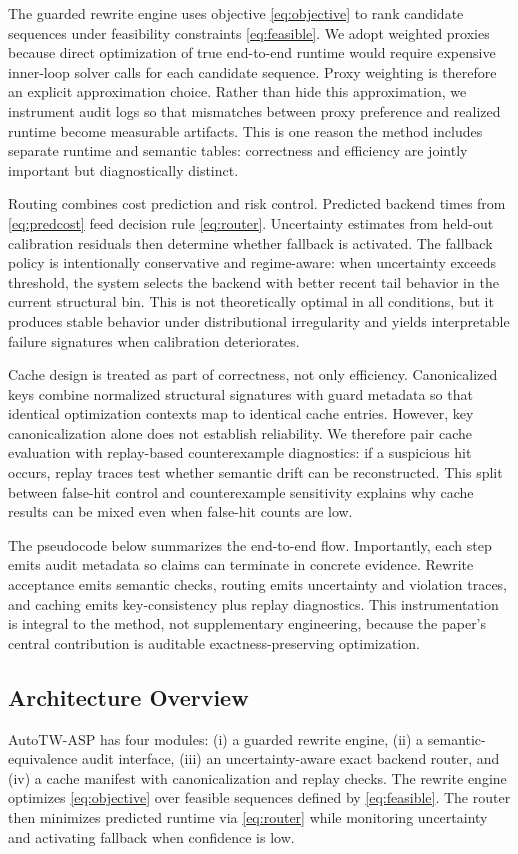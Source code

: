 \documentclass{article} %
\begin{document}
The guarded rewrite engine uses objective \eqref{eq:objective} to rank candidate sequences under feasibility constraints \eqref{eq:feasible}. We adopt weighted proxies because direct optimization of true end-to-end runtime would require expensive inner-loop solver calls for each candidate sequence. Proxy weighting is therefore an explicit approximation choice. Rather than hide this approximation, we instrument audit logs so that mismatches between proxy preference and realized runtime become measurable artifacts. This is one reason the method includes separate runtime and semantic tables: correctness and efficiency are jointly important but diagnostically distinct.

Routing combines cost prediction and risk control. Predicted backend times from \eqref{eq:predcost} feed decision rule \eqref{eq:router}. Uncertainty estimates from held-out calibration residuals then determine whether fallback is activated. The fallback policy is intentionally conservative and regime-aware: when uncertainty exceeds threshold, the system selects the backend with better recent tail behavior in the current structural bin. This is not theoretically optimal in all conditions, but it produces stable behavior under distributional irregularity and yields interpretable failure signatures when calibration deteriorates.

Cache design is treated as part of correctness, not only efficiency. Canonicalized keys combine normalized structural signatures with guard metadata so that identical optimization contexts map to identical cache entries. However, key canonicalization alone does not establish reliability. We therefore pair cache evaluation with replay-based counterexample diagnostics: if a suspicious hit occurs, replay traces test whether semantic drift can be reconstructed. This split between false-hit control and counterexample sensitivity explains why cache results can be mixed even when false-hit counts are low.

The pseudocode below summarizes the end-to-end flow. Importantly, each step emits audit metadata so claims can terminate in concrete evidence. Rewrite acceptance emits semantic checks, routing emits uncertainty and violation traces, and caching emits key-consistency plus replay diagnostics. This instrumentation is integral to the method, not supplementary engineering, because the paper's central contribution is auditable exactness-preserving optimization.

\subsection{Architecture Overview}
AutoTW-ASP has four modules: (i) a guarded rewrite engine, (ii) a semantic-equivalence audit interface, (iii) an uncertainty-aware exact backend router, and (iv) a cache manifest with canonicalization and replay checks. The rewrite engine optimizes \eqref{eq:objective} over feasible sequences defined by \eqref{eq:feasible}. The router then minimizes predicted runtime via \eqref{eq:router} while monitoring uncertainty and activating fallback when confidence is low.
\end{document}
